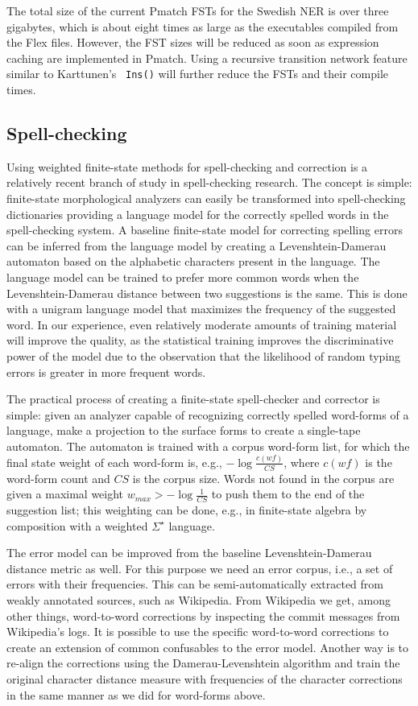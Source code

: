 \documentclass{llncs}
\begin{document}
The total size of the current Pmatch
FSTs for the Swedish NER is over three gigabytes, which is about eight times as large as the
executables compiled from the Flex files. However, the FST sizes
will be reduced as soon as expression caching
are implemented in Pmatch. Using a recursive transition network
feature similar to Karttunen's~\cite{karttunen/2011} \texttt{Ins()}
will further reduce the FSTs and their compile times.

\subsection{Spell-checking}
Using weighted finite-state methods for spell-checking and correction 
is a relatively recent branch of study in spell-checking research. The concept
is simple: finite-state morphological analyzers can easily be transformed
into spell-checking dictionaries providing a language model for the correctly
spelled words in the spell-checking system. A baseline finite-state model for
correcting spelling errors can be inferred from the language model by creating
a Levenshtein-Damerau automaton based on the alphabetic characters present in
the language. The language model can be trained to prefer more common
words when the Levenshtein-Damerau distance between two suggestions is the same.
This is done with a unigram language model that maximizes
the frequency of the suggested word. In our experience, even relatively moderate
amounts of training material will improve the quality, as the statistical training
improves the discriminative power of the model due to the observation that the likelihood of random
typing errors is greater in more frequent words.

The practical process of creating a finite-state spell-checker and corrector
is simple: given an analyzer capable of recognizing correctly spelled
word-forms of a language, make a projection to the surface forms to create a
single-tape automaton. The automaton is trained with a corpus word-form list, 
for which the final state weight of each word-form is, e.g., $-\log\frac{c(wf)}{CS}$, where 
$c(wf)$ is the word-form count and $CS$ is the corpus size. Words not
found in the corpus are given a maximal weight $w_{max} > -\log\frac{1}{CS}$ to
push them to the end of the suggestion list; this weighting can be done, e.g.,
in finite-state algebra by composition with a weighted $\Sigma^{\star}$ language.

The error model can be improved from the baseline Levenshtein-Damerau distance
metric as well. For this purpose we need an error corpus, i.e., a set of
errors with their frequencies. This can be semi-automatically extracted from
weakly annotated sources, such as Wikipedia. From Wikipedia we get, among 
other things, word-to-word corrections by inspecting the commit messages
from Wikipedia's logs. It is possible to use the specific
word-to-word corrections to create an extension of common confusables to the
error model. Another way is to re-align the corrections using the
Damerau-Levenshtein algorithm and train the original character distance measure with
frequencies of the character corrections in the same manner as we did for word-forms above.
\end{document}

